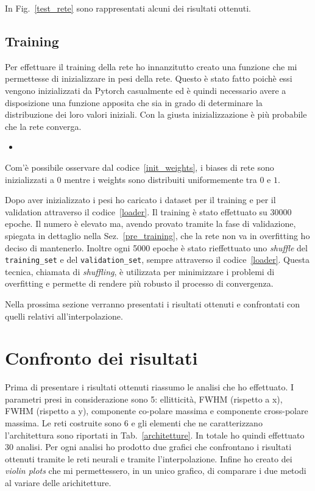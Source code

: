 \documentclass[12pt,a4paper,final]{book}
\newcommand{\insertcode}[2]{\begin{itemize}\item[]\end{itemize}} %
\begin{document}
In Fig.~\ref{test_rete} sono rappresentati alcuni dei risultati ottenuti.



\subsection{Training}\label{training}
Per effettuare il training della rete ho innanzitutto creato una funzione che mi permettesse di inizializzare in pesi della rete. Questo è stato fatto poichè essi vengono inizializzati da Pytorch casualmente ed è quindi necessario avere a disposizione una funzione apposita che sia in grado di determinare la distribuzione dei loro valori iniziali. Con la giusta inizializzazione è più probabile che la rete converga.
\insertcode{../scripts/init_weights.py}{Inizializzazione di weights e biases}\label{init_weights}
Com'è possibile osservare dal codice~\ref{init_weights}, i biases di rete sono inizializzati a $0$ mentre i weights sono distribuiti uniformemente tra $0$ e $1$.


Dopo aver inizializzato i pesi ho caricato i dataset per il training e per il validation attraverso il codice~\ref{loader}.
Il training è stato effettuato su 30000 epoche. Il numero è elevato ma, avendo provato tramite la fase di validazione, spiegata in dettaglio nella Sez.~\ref{pre_training}, che la rete non va in overfitting ho deciso di mantenerlo. 
Inoltre ogni 5000 epoche è stato rieffettuato uno \textit{shuffle} del \texttt{training\_set} e del \texttt{validation\_set}, sempre attraverso il codice~\ref{loader}. Questa tecnica, chiamata di \textit{shuffling}, è utilizzata per minimizzare i problemi di overfitting e permette di rendere più robusto il processo di convergenza.


Nella prossima sezione verranno presentati i risultati ottenuti e confrontati con quelli relativi all'interpolazione.


\section{Confronto dei risultati}\label{risultati}
Prima di presentare i risultati ottenuti riassumo le analisi che ho effettuato. I parametri presi in considerazione sono 5: ellitticità, FWHM (rispetto a x), FWHM (rispetto a y), componente co-polare massima e componente cross-polare massima. Le reti costruite sono 6 e gli elementi che ne caratterizzano l'architettura sono riportati in Tab.~\ref{architetture}. In totale ho quindi effettuato 30 analisi.
Per ogni analisi ho prodotto due grafici che confrontano i risultati ottenuti tramite le  reti neurali e tramite l'interpolazione. Infine ho creato dei \textit{violin plots} che mi permettessero, in un unico grafico, di comparare i due metodi al variare delle arichitetture.
\end{document}
